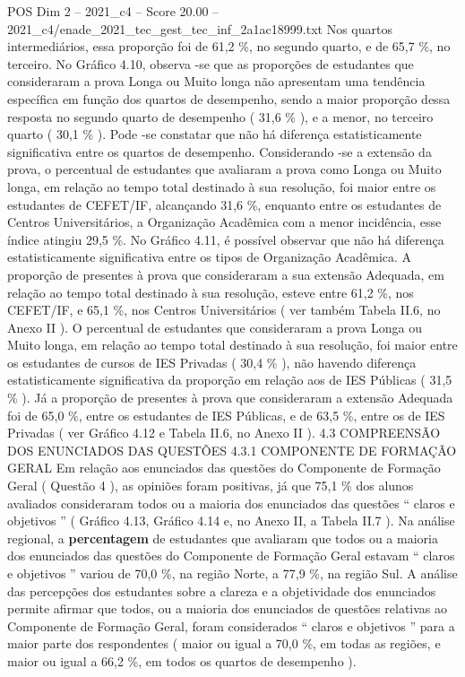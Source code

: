 \begin{textsample}{POS Dim 2 – 2021\_c4 – Score 20.00 – 2021\_c4/enade\_2021\_tec\_gest\_tec\_inf\_2a1ac18999.txt}
Nos quartos intermediários, essa proporção foi de 61,2 \%, no segundo quarto, e de 65,7 \%, no terceiro.
No Gráfico 4.10, observa -se que as proporções de estudantes que consideraram a prova Longa ou Muito longa não apresentam uma tendência específica em função dos quartos de desempenho, sendo a maior proporção dessa resposta no segundo quarto de desempenho ( 31,6 \% ), e a menor, no terceiro quarto ( 30,1 \% ).
Pode -se constatar que não há diferença estatisticamente significativa entre os quartos de desempenho.
Considerando -se a extensão da prova, o percentual de estudantes que avaliaram a prova como Longa ou Muito longa, em relação ao tempo total destinado à sua resolução, foi maior entre os estudantes de CEFET/IF, alcançando 31,6 \%, enquanto entre os estudantes de Centros Universitários, a Organização Acadêmica com a menor incidência, esse índice atingiu 29,5 \%.
No Gráfico 4.11, é possível observar que não há diferença estatisticamente significativa entre os tipos de Organização Acadêmica.
A proporção de presentes à prova que consideraram a sua extensão Adequada, em relação ao tempo total destinado à sua resolução, esteve entre 61,2 \%, nos CEFET/IF, e 65,1 \%, nos Centros Universitários ( ver também Tabela II.6, no Anexo II ).
O percentual de estudantes que consideraram a prova Longa ou Muito longa, em relação ao tempo total destinado à sua resolução, foi maior entre os estudantes de cursos de IES Privadas ( 30,4 \% ), não havendo diferença estatisticamente significativa da proporção em relação aos de IES Públicas ( 31,5 \% ).
Já a proporção de presentes à prova que consideraram a extensão Adequada foi de 65,0 \%, entre os estudantes de IES Públicas, e de 63,5 \%, entre os de IES Privadas ( ver Gráfico 4.12 e Tabela II.6, no Anexo II ). 4.3 COMPREENSÃO DOS ENUNCIADOS DAS QUESTÕES 4.3.1 COMPONENTE DE FORMAÇÃO GERAL Em relação aos enunciados das questões do Componente de Formação Geral ( Questão 4 ), as opiniões foram positivas, já que 75,1 \% dos alunos avaliados consideraram todos ou a maioria dos enunciados das questões “ claros e objetivos ” ( Gráfico 4.13, Gráfico 4.14 e, no Anexo II, a Tabela II.7 ).
Na análise regional, a \textbf{percentagem} de estudantes que avaliaram que todos ou a maioria dos enunciados das questões do Componente de Formação Geral estavam “ claros e objetivos ” variou de 70,0 \%, na região Norte, a 77,9 \%, na região Sul.
A análise das percepções dos estudantes sobre a clareza e a objetividade dos enunciados permite afirmar que todos, ou a maioria dos enunciados de questões relativas ao Componente de Formação Geral, foram considerados “ claros e objetivos ” para a maior parte dos respondentes ( maior ou igual a 70,0 \%, em todas as regiões, e maior ou igual a 66,2 \%, em todos os quartos de desempenho ).

\end{textsample}
